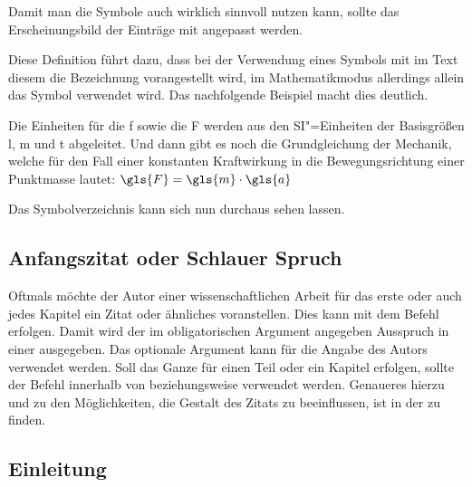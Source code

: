 \documentclass[%
  english,ngerman,%
  geometry=no,DIV=12,automark,%
]{tudscrartcl}
\begin{document}
Damit man die Symbole auch wirklich sinnvoll nutzen kann, sollte das 
Erscheinungsbild der Einträge mit  angepasst werden.
%
\begin{Excerpt}
\end{Excerpt}
%
Diese Definition führt dazu, dass bei der Verwendung eines Symbols mit
 im Text diesem die Bezeichnung vorangestellt 
wird, im Mathematikmodus allerdings allein das Symbol verwendet wird. Das 
nachfolgende Beispiel macht dies deutlich.
%
\begin{Excerpt}
Die Einheiten für die \gls{f} sowie die \gls{F} werden aus den
SI"=Einheiten der Basisgrößen \gls{l}, \gls{m} und \gls{t} abgeleitet.
Und dann gibt es noch die Grundgleichung der Mechanik, welche für den
Fall einer konstanten Kraftwirkung in die Bewegungsrichtung einer
Punktmasse lautet:
$\gls{F} = \gls{m} \cdot \gls{a}$
\end{Excerpt}
%
Das Symbolverzeichnis kann sich nun durchaus sehen lassen.
%
\begin{Excerpt*}
\printsymbols[style=symbolslongtabu]
\end{Excerpt*}
\begin{quoting}[rightmargin=0pt]
\printsymbols[style=symbolstabu]
\end{quoting}


\section{Anfangszitat oder Schlauer Spruch}
\bigskip\noindent
Oftmals möchte der Autor einer wissenschaftlichen Arbeit für das erste oder 
auch jedes Kapitel ein Zitat oder ähnliches voranstellen. Dies kann mit dem 
Befehl  erfolgen. Damit wird 
der im obligatorischen Argument angegeben Ausspruch in einer  
ausgegeben. Das optionale Argument kann für die Angabe des Autors verwendet 
werden. Soll das Ganze für einen Teil oder ein Kapitel erfolgen, sollte der 
Befehl  innerhalb von  beziehungsweise 
 verwendet werden. Genaueres hierzu und zu den 
Möglichkeiten, die Gestalt des Zitats zu beeinflussen, ist in der \scrguide zu 
finden.
\begin{Excerpt*}
\chapter{Einleitung}
\end{Excerpt*}
\end{document}
